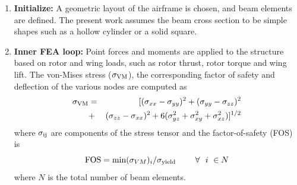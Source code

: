 \begin{enumerate}
\item {\bf Initialize: } A geometric layout of the airframe is chosen, and beam elements are defined. The present work assumes the beam cross section to be simple shapes such as a hollow cylinder or a solid square.

\item {\bf Inner FEA loop: } Point forces and moments are applied to the structure based on rotor and wing loads, such as rotor thrust, rotor torque and wing lift. The von-Mises stress ($\sigma_{\rm VM}$), the corresponding factor of safety and deflection of the various nodes are computed as
\begin{eqnarray}
\sigma_{\rm VM} &=& [ (\sigma_{xx}-\sigma_{yy})^2 + (\sigma_{yy}-\sigma_{zz})^2   \\ \nonumber
&+& (\sigma_{zz}-\sigma_{xx})^2 + 6(\sigma_{yz}^2+\sigma_{xy}^2+\sigma_{xz}^2) ]^{1/2}
\end{eqnarray}
where $\sigma_{\rm ij}$ are components of the stress tensor and the factor-of-safety (FOS) is
\begin{equation}
{\rm FOS} = {\rm min}(\sigma_{VM})_i / \sigma_{\rm yield} \qquad  \ \forall\ \ i\ \in N
\end{equation}
where $N$ is the total number of beam elements.


\end{enumerate}
